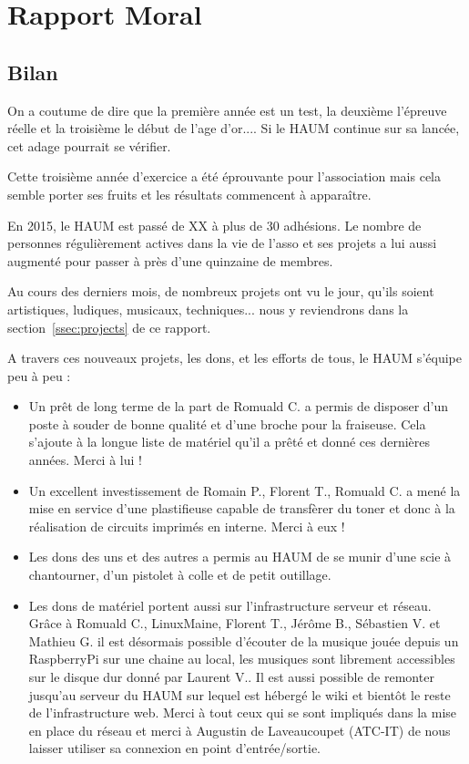 \documentclass[11pt]{article}
\begin{document}
\section{Rapport Moral}


\subsection{Bilan}

On a coutume de dire que la première année est un test, la deuxième l'épreuve réelle et la troisième le début de l'age
d'or.... Si le HAUM continue sur sa lancée, cet adage pourrait se vérifier.

Cette troisième année d'exercice a été éprouvante pour l'association mais cela semble porter ses fruits et les résultats
commencent à apparaître.

En 2015, le HAUM est passé de XX à plus de 30 adhésions. Le nombre de personnes r\'eguli\`erement actives dans la vie de l'asso
et ses projets a lui aussi augmenté pour passer à près d'une quinzaine de membres.

Au cours des derniers mois, de nombreux projets ont vu le jour, qu'ils soient artistiques, ludiques, musicaux,
techniques... nous y reviendrons dans la section~\ref{ssec:projects} de ce rapport.

A travers ces nouveaux projets, les dons, et les efforts de tous, le HAUM s'équipe peu à peu :

\begin{itemize}
	\item Un prêt de long terme de la part de Romuald C. a permis de disposer d'un poste à souder de bonne qualité et
		d'une broche pour la fraiseuse. Cela s'ajoute à la longue liste de matériel qu'il a prêté et donné ces dernières
		années. Merci à lui !
	\item Un excellent investissement de Romain P., Florent T., Romuald C. a mené la mise en service d'une plastifieuse
		capable de transfèrer du toner et donc à la réalisation de circuits imprimés en interne. Merci à eux !
	\item Les dons des uns et des autres a permis au HAUM de se munir d'une scie à chantourner, d'un pistolet à colle et
		de petit outillage.
	\item Les dons de matériel portent aussi sur l'infrastructure serveur et réseau. Grâce à Romuald C., LinuxMaine,
		Florent T., Jérôme B., Sébastien V. et Mathieu G. il est désormais possible d'écouter de la musique jouée depuis un
		RaspberryPi sur une chaine au local, les musiques sont librement accessibles sur le disque dur donné par Laurent
		V.. Il est aussi possible de remonter jusqu'au serveur du HAUM sur lequel est hébergé le wiki et bientôt le
		reste de l'infrastructure web. Merci à tout ceux qui se sont impliqués dans la mise en place du réseau et merci
		à Augustin de Laveaucoupet (ATC-IT) de nous laisser utiliser sa connexion en point d'entrée/sortie.
\end{itemize}
\end{document}
